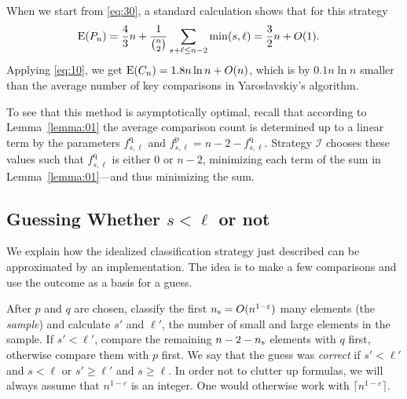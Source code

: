 \documentclass[prodmode,acmtalg]{acmsmall}
\newcommand{\E}{\textnormal{\textrm{E}}}
\newcommand{\Samplesize}{\ensuremath{n_{\textnormal{\textrm{s}}}}}
\begin{document}
 When we start from \eqref{eq:30}, 
 a standard calculation shows that for this strategy
 \begin{align}\label{eq:80}
     \E(P_n) &= \frac{4}{3} n + \frac{1}{\binom{n}{2}}\sum_{s +
 \ell \leq n - 2} \min(s, \ell)  = \frac{3}{2} n + O(1).
 \end{align}
 Applying \eqref{eq:10}, we get
$\E(C_n) = 1.8 n \ln n + O(n)$,
which is by $0.1n\ln n$ smaller than the average number of key
comparisons in Yaroslavskiy's algorithm.

To see that this method is asymptotically optimal, 
recall that according to
Lemma~\ref{lemma:01} 
the average comparison count is determined up to a linear term by
the parameters $f^\text{q}_{s,\ell}$ and
$f^\text{p}_{s,\ell} = n - 2 - f^\text{q}_{s,\ell}$.
Strategy $\mathcal{I}$ chooses these values such that $f^\text{q}_{s,\ell}$ is
either $0$ or $n-2$, minimizing each term of the sum in
Lemma~\ref{lemma:01}---and thus minimizing the sum.

\subsection{Guessing Whether $s < \ell$ or not}
We explain how the idealized classification strategy just described can be approximated by an
implementation. The idea is to make a few comparisons and use the outcome
as a basis for a guess.

After $p$ and $q$ are chosen,  classify the first $\Samplesize=O(n^{1-\varepsilon})$ many
elements (the \emph{sample})
and calculate $s'$ and $\ell'$, the number of
small and large elements in the sample. If $s' < \ell'$, compare the remaining
$n - 2 - \Samplesize$ elements with $q$ first, otherwise  compare them with
$p$ first. We say that the guess was \emph{correct} if 
$s' < \ell'$ and $s < \ell$ or $s' \geq \ell'$ and $s \geq \ell$. In order not to clutter up formulas,
we will always assume that $n^{1-\varepsilon}$ is an integer. One would otherwise
work with $\lceil n^{1-\varepsilon}\rceil$. 
\end{document}

